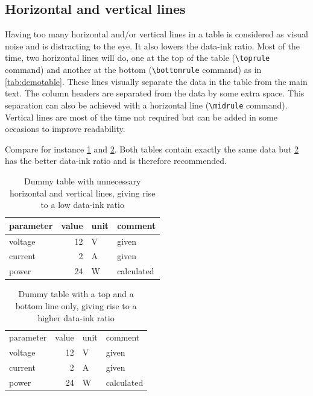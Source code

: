 \subsection{Horizontal and vertical lines}
Having too many horizontal and/or vertical lines in a table is considered as visual noise and is distracting to the eye. It also lowers the data-ink ratio. Most of the time, two horizontal lines will do, one at the top of the table (\verb|\toprule| command) and another at the bottom (\verb|\bottomrule| command) as in \cref{tab:demotable}. These lines visually separate the data in the table from the main text. The column headers are separated from the data by some extra space. This separation can also be achieved with a horizontal line (\verb|\midrule| command). Vertical lines are most of the time not required but can be added in some occasions to improve readability.

Compare for instance \cref{tab:demo1} and \cref{tab:demo2}. Both tables contain exactly the same data but \cref{tab:demo2} has the better data-ink ratio and is therefore recommended.

\begin{table}\centering
    \caption{Dummy table with unnecessary horizontal and vertical lines, giving rise to a low data-ink ratio}\label{tab:demo1}
    \begin{tabular}{|l|r|l|l|} 
        \hline
         parameter  &  value & unit         & comment\\[1.5ex]    
         \hline
         voltage    &  12   & \si{\volt}    & given\\
         \hline
         current    &  2    & \si{\ampere}  & given\\
         \hline
        power       &  24   & \si{\watt}    & calculated\\
        \hline
    \end{tabular}
\end{table}

\begin{table}\centering
    \caption{Dummy table with a top and a bottom line only, giving rise to a higher data-ink ratio}\label{tab:demo2}
    \begin{tabular}{lrll}  
        \toprule
         parameter  &  value & unit         & comment\\[1ex]
         voltage    &  12   & \si{\volt}    & given\\
         current    &  2    & \si{\ampere}  & given\\
        power       &  24   & \si{\watt}    & calculated\\
        \bottomrule
    \end{tabular}
\end{table}

